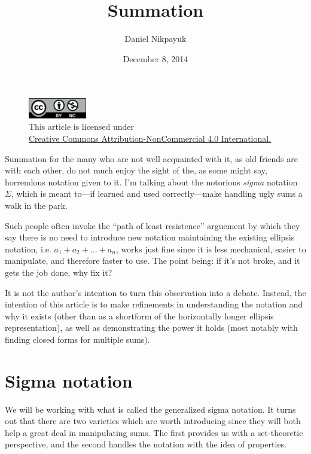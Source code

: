 \documentclass[twoside]{article}
\title{Summation}
\author{Daniel Nikpayuk}
\date{December 8, 2014}
\begin{document}
\maketitle

\begin{figure}[h]
\centering
\includegraphics[width=1in]{../../../cc-by-nc.png}\\[0.1in]
\tiny This article is licensed under \\
\href{http://creativecommons.org/licenses/by-nc/4.0/}
{Creative Commons Attribution-NonCommercial 4.0 International.}\\[0.3in]
\end{figure}

Summation for the many who are not well acquainted with it, as 
old friends are with each other, do not much enjoy the sight of 
the, as some might say, horrendous notation given to it.  I'm 
talking about the notorious \emph{sigma} notation $  \Sigma  $, 
which is meant \mbox{to---if} learned and used 
\mbox{correctly---make} handling ugly sums a walk in the park.

Such people often invoke the ``path of least resistence'' 
arguement by which they say there is no need to introduce new 
notation maintaining the existing ellipsis notation, i.e. 
$  a_1+a_2+\ldots +a_n  $, works just fine since it is less 
mechanical, easier to manipulate, and therefore faster to use.  
The point being: if it's not broke, and it gets the job done,
why fix it?

It is not the author's intention to turn this observation into 
a debate.  Instead, the intention of this article is to make 
refinements in understanding the notation and why it exists 
(other than as a shortform of the horizontally longer ellipsis 
representation), as well as demonstrating the power it holds 
(most notably with finding closed forms for multiple sums).

\section{Sigma notation}

We will be working with what is called the generalized sigma
notation.  It turns out that there are two varieties which
are worth introducing since they will both help a great deal in
manipulating sums.  The first provides us with a
set-theoretic perspective, and the second handles the notation 
with the idea of properties. 
\end{document}
